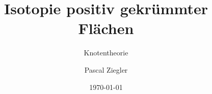 

\title[Isotopie positiv gekrümmter Flächen]{Isotopie positiv gekrümmter Flächen}
\subtitle{Knotentheorie}
\author{Pascal Ziegler}
\webaddress{} %
\date{\today}
\subject{Knotentheorie}


\logo{\vskip6mm} %



